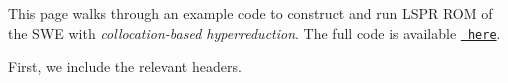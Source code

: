 

\begin{DoxyParagraph}{}
This page walks through an example code to construct and run L\+S\+PR R\+OM of the S\+WE with {\itshape collocation-\/based hyperreduction}. The full code is available \href{https://github.com/Pressio/pressio-tutorials/blob/swe2d_tutorial/tutorials/swe2d/online_phase/lspg_hyperReducedRom/main.cc}{\texttt{ here}}.
\end{DoxyParagraph}
First, we include the relevant headers. 
\begin{DoxyCode}{0}
\end{DoxyCode}


